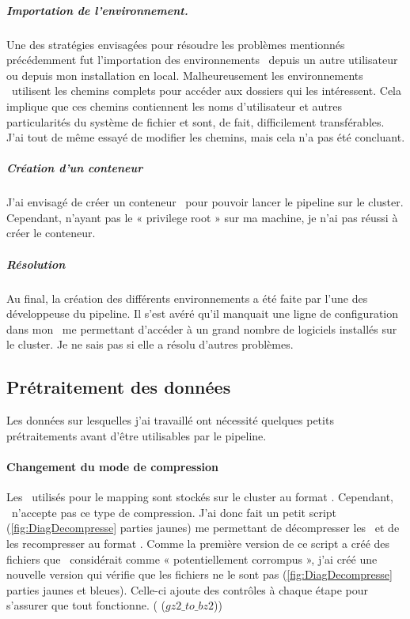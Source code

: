 \documentclass[../main]{subfiles} %
\begin{document}
\subparagraph{Importation de l’environnement.} Une des stratégies envisagées  pour résoudre les problèmes mentionnés précédemment fut l’importation des environnements \Conda depuis un autre utilisateur ou depuis mon installation en local. Malheureusement les environnements \Conda utilisent les chemins complets pour accéder aux dossiers qui les intéressent. Cela implique que ces chemins contiennent les noms d’utilisateur et autres particularités du système de fichier et sont, de fait, difficilement transférables. J’ai tout de même essayé de modifier les chemins, mais cela n’a pas été concluant.

\subparagraph{Création d’un conteneur \Singularity} J’ai envisagé de créer un conteneur \Singularity pour pouvoir lancer le pipeline sur le \gls{cluster}. Cependant, n’ayant pas le « privilege root » sur ma machine, je n’ai pas réussi à créer le conteneur.

\subparagraph{Résolution} Au final, la création des différents environnements a été faite par l’une des développeuse du pipeline. Il s’est avéré qu’il manquait une ligne de configuration dans mon \bashrc me permettant d’accéder à un grand nombre de logiciels installés sur le \gls{cluster}. Je ne sais pas si elle a résolu d’autres problèmes.


\subsection{Prétraitement des données}
Les données sur lesquelles j’ai travaillé ont nécessité quelques petits prétraitements avant d’être utilisables par le pipeline. 

\paragraph{Changement du mode de compression}

Les \fastq utilisés pour le \gls{mapping} sont stockés sur le \gls{cluster} au format \bz. Cependant, \GeCKO n’accepte pas ce type de compression. J’ai donc fait un petit script (\cref{fig:DiagDecompresse}  parties jaunes) me permettant de décompresser les \bz et de les recompresser au format \gz. Comme la première version de ce script a créé des fichiers que \GeCKO considérait comme « potentiellement corrompus », j’ai créé une nouvelle version qui vérifie que les fichiers ne le sont pas (\cref{fig:DiagDecompresse} parties jaunes et bleues). Celle-ci ajoute des contrôles à chaque étape pour s’assurer que tout fonctionne.  (\cite{florent_f-marchalm1bioinfointernship2024-inrae_agap_ge2pop_2024} ($gz2\_to\_bz2$))
\end{document}
